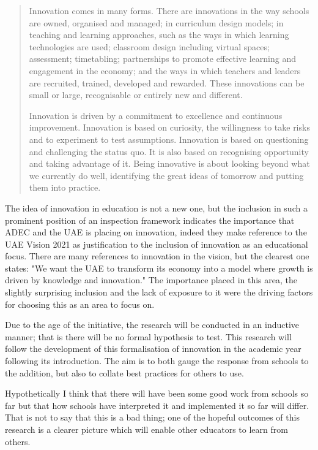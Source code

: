 \begin{quote}
Innovation comes in many forms. There are innovations in the way schools are owned, organised and managed; in curriculum design models; in teaching and learning approaches, such as the ways in which learning technologies are used; classroom design including virtual spaces; assessment; timetabling; partnerships to promote effective learning and engagement in the economy; and the ways in which teachers and leaders are recruited, trained, developed and rewarded. These innovations can be small or large, recognisable or entirely new and different.

Innovation is driven by a commitment to excellence and continuous improvement. Innovation is based on curiosity, the willingness to take risks and to experiment to test assumptions. Innovation is based on questioning and challenging the status quo. It is also based on recognising opportunity and taking advantage of it. Being innovative is about looking beyond what we currently do well, identifying the great ideas of tomorrow and putting them into practice.
\end{quote} \cite[p.12]{ADEC2015}

The idea of innovation in education is not a new one, but the inclusion in such a prominent position of an inspection framework indicates the importance that ADEC and the UAE is placing on innovation, indeed they make reference to the UAE Vision 2021 as justification to the inclusion of innovation as an educational focus. There are many references to innovation in the vision, but the clearest one states: "We want the UAE to transform its economy into a model where growth is driven by knowledge and innovation." \cite{UAEGovernment2012} The importance placed in this area, the slightly surprising inclusion and the lack of exposure to it were the driving factors for choosing this as an area to focus on.

Due to the age of the initiative, the research will be conducted in an inductive manner; that is there will be no formal hypothesis to test. This research will follow the development of this formalisation of innovation in the academic year following its introduction. The aim is to both gauge the response from schools to the addition, but also to collate best practices for others to use.


Hypothetically I think that there will have been some good work from schools so far but that how schools have interpreted it and implemented it so far will differ. That is not to say that this is a bad thing; one of the hopeful outcomes of this research is a clearer picture which will enable other educators to learn from others.

